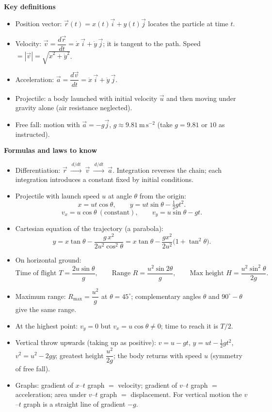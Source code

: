 \documentclass[11pt]{article}
\newcommand{\cle}[1]{{\popxbold\color{popdark}#1}}
\begin{document}
\begin{bilan}
\textbf{Key definitions}
\begin{itemize}
\item \cle{Position vector}: $\vec{r}(t)=x(t)\vec{i}+y(t)\vec{j}$ locates the particle at time $t$.
\item \cle{Velocity}: $\vec{v}=\dfrac{d\vec{r}}{dt}=\dot{x}\,\vec{i}+\dot{y}\,\vec{j}$; it is tangent to the path. Speed $=|\vec{v}|=\sqrt{\dot{x}^2+\dot{y}^2}$.
\item \cle{Acceleration}: $\vec{a}=\dfrac{d\vec{v}}{dt}=\ddot{x}\,\vec{i}+\ddot{y}\,\vec{j}$.
\item \cle{Projectile}: a body launched with initial velocity $\vec{u}$ and then moving under gravity alone (air resistance neglected).
\item \cle{Free fall}: motion with $\vec{a}=-g\vec{j}$, $g\approx 9.81\ \mathrm{m\,s^{-2}}$ (take $g=9.81$ or $10$ as instructed).
\end{itemize}

\textbf{Formulas and laws to know}
\begin{itemize}
\item Differentiation: $\vec{r}\ \xrightarrow{\ d/dt\ }\ \vec{v}\ \xrightarrow{\ d/dt\ }\ \vec{a}$. Integration reverses the chain; each integration introduces a constant fixed by initial conditions.
\item Projectile with launch speed $u$ at angle $\theta$ from the origin:
\[ x=ut\cos\theta, \qquad y=ut\sin\theta-\tfrac12 gt^2. \]
\[ v_x=u\cos\theta \ (\text{constant}), \qquad v_y=u\sin\theta-gt. \]
\item Cartesian equation of the \cle{trajectory} (a parabola):
\[ y=x\tan\theta-\frac{g\,x^2}{2u^2\cos^2\theta}=x\tan\theta-\frac{g x^2}{2u^2}\bigl(1+\tan^2\theta\bigr). \]
\item On horizontal ground:
\[ \text{Time of flight } T=\frac{2u\sin\theta}{g},\qquad \text{Range } R=\frac{u^2\sin 2\theta}{g},\qquad \text{Max height } H=\frac{u^2\sin^2\theta}{2g}. \]
\item Maximum range: $R_{\max}=\dfrac{u^2}{g}$ at $\theta=45^\circ$; complementary angles $\theta$ and $90^\circ-\theta$ give the same range.
\item At the highest point: $v_y=0$ but $v_x=u\cos\theta\neq 0$; time to reach it is $T/2$.
\item Vertical throw upwards (taking up as positive): $v=u-gt$, $y=ut-\tfrac12 gt^2$, $v^2=u^2-2gy$; greatest height $\dfrac{u^2}{2g}$; the body returns with speed $u$ (symmetry of free fall).
\item Graphs: gradient of $x$--$t$ graph $=$ velocity; gradient of $v$--$t$ graph $=$ acceleration; area under $v$--$t$ graph $=$ displacement. For vertical motion the $v$--$t$ graph is a straight line of gradient $-g$.
\end{itemize}


\end{bilan}
\end{document}
